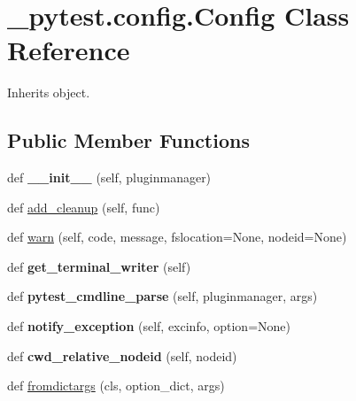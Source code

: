 \hypertarget{class__pytest_1_1config_1_1_config}{}\section{\+\_\+pytest.\+config.\+Config Class Reference}
\label{class__pytest_1_1config_1_1_config}


Inherits object.

\subsection*{Public Member Functions}
\begin{DoxyCompactItemize}
\item 
\mbox{\label{class__pytest_1_1config_1_1_config_acec547e5fbc5b6bd50fb84a7012ccb6c}} 
def {\bfseries \+\_\+\+\_\+init\+\_\+\+\_\+} (self, pluginmanager)
\item 
def \hyperlink{class__pytest_1_1config_1_1_config_a38d8688170020acdbf7f63049d6dddde}{add\+\_\+cleanup} (self, func)
\item 
def \hyperlink{class__pytest_1_1config_1_1_config_a8190b2a08b33a99d6f6a2cb561ea7216}{warn} (self, code, message, fslocation=None, nodeid=None)
\item 
\mbox{\label{class__pytest_1_1config_1_1_config_ad52be45ec3bd8c562ba936eb2bafeef6}} 
def {\bfseries get\+\_\+terminal\+\_\+writer} (self)
\item 
\mbox{\label{class__pytest_1_1config_1_1_config_a4276ec9c380e08fafcb26863a1a32eed}} 
def {\bfseries pytest\+\_\+cmdline\+\_\+parse} (self, pluginmanager, args)
\item 
\mbox{\label{class__pytest_1_1config_1_1_config_a4d1658be9c5a84bec9f4a02ad1a323bd}} 
def {\bfseries notify\+\_\+exception} (self, excinfo, option=None)
\item 
\mbox{\label{class__pytest_1_1config_1_1_config_a27c11ef63243826fc124da84c03d7219}} 
def {\bfseries cwd\+\_\+relative\+\_\+nodeid} (self, nodeid)
\item 
def \hyperlink{class__pytest_1_1config_1_1_config_ad624229020a49d64484ca1f61cba5cfd}{fromdictargs} (cls, option\+\_\+dict, args)

\end{DoxyCompactItemize}
